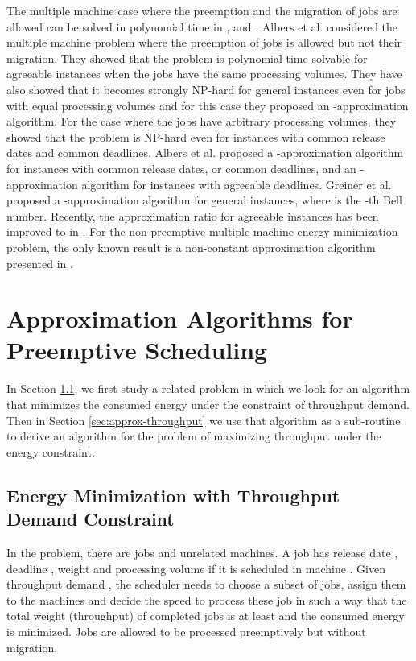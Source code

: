 \documentclass[11pt,a4paper]{article}
\begin{document}
The multiple machine case where the preemption and the migration of jobs are allowed can be solved in polynomial time in
\cite{DBLP:conf/spaa/AlbersAG11}, \cite{DBLP:conf/europar/AngelBKL12} and \cite{DBLP:conf/isaac/BampisLL12}.
Albers et al. \cite{DBLP:conf/spaa/AlbersMS07} considered the multiple machine problem
where the preemption of jobs is allowed but not their migration. They showed that the problem is polynomial-time solvable for agreeable instances when the jobs
have the same processing volumes. They have also showed that it becomes strongly
NP-hard for general instances even for jobs with equal processing volumes and for this case
they proposed an -approximation algorithm. For the case
where the jobs have arbitrary processing volumes, they showed that  the problem is NP-hard
even for instances with common release dates and common deadlines. Albers et
al. proposed a -approximation algorithm for instances with common
release dates, or common deadlines, and an
-approximation algorithm for
instances with agreeable deadlines. 
Greiner et al.  \cite{DBLP:conf/spaa/GreinerNS09} proposed a -approximation algorithm for general instances, 
where  is the -th Bell number.
Recently, the approximation ratio for agreeable instances has been improved to
 in \cite{BKLLN13}. For the non-preemptive multiple machine energy minimization problem, the only known result is a non-constant approximation algorithm presented in \cite{BKLLN13}.



\section{Approximation Algorithms for Preemptive Scheduling}		\label{sec:approx}

In Section \ref{sec:approx-energy}, we first study a related problem in which we look for an algorithm
that minimizes the consumed energy under the constraint of throughput demand. 
Then in Section \ref{sec:approx-throughput} we use that algorithm as a sub-routine to derive an algorithm for 
the problem of maximizing throughput under the energy constraint. 

\subsection{Energy Minimization with Throughput Demand Constraint}	\label{sec:approx-energy}

In the problem, there are  jobs and  unrelated machines. 
A job  has release date , deadline ,
weight  and processing volume  if it is scheduled in machine . 
Given throughput demand , the scheduler needs to choose a 
subset of jobs, assign them to the machines and decide the speed 
to process these job in such a way that the total weight (throughput) of completed 
jobs is at least  and the consumed energy is minimized. 
Jobs are allowed to be processed preemptively but without migration.   
\end{document}
